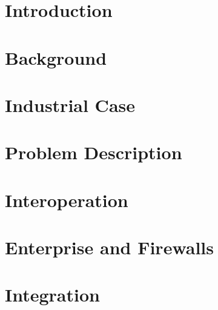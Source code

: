 \chapter{Introduction}


\chapter{Background}


%

%

\chapter{Industrial Case}


\chapter{Problem Description}



\chapter{Interoperation}


\chapter{Enterprise and Firewalls}


\chapter{Integration}


